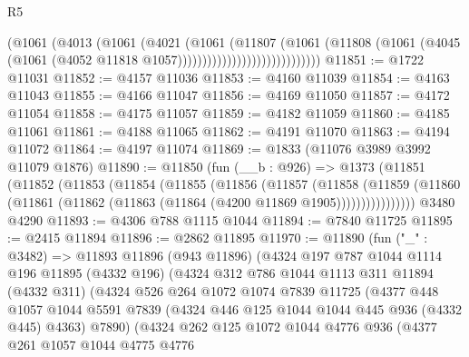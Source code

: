 \begin{lexlean}{R5}
\begin{coremodule}
                                      (@1061
                                        (@4013
                                          (@1061
                                            (@4021
                                              (@1061
                                                (@11807
                                                  (@1061
                                                    (@11808
                                                      (@1061
                                                        (@4045
                                                          (@1061
                                                            (@4052
                                                              @11818
                                                              @1057)))))))))))))))))))))))))))))
@11851 := @1722 @11031
@11852 := @4157 @11036
@11853 := @4160 @11039
@11854 := @4163 @11043
@11855 := @4166 @11047
@11856 := @4169 @11050
@11857 := @4172 @11054
@11858 := @4175 @11057
@11859 := @4182 @11059
@11860 := @4185 @11061
@11861 := @4188 @11065
@11862 := @4191 @11070
@11863 := @4194 @11072
@11864 := @4197 @11074
@11869 := @1833 (@11076 @3989 @3992 @11079 @1876)
@11890 := @11850
    (fun (__b : @926) =>
    @1373
      (@11851
        (@11852
          (@11853
            (@11854
              (@11855
                (@11856
                  (@11857
                    (@11858
                      (@11859
                        (@11860 (@11861 (@11862 (@11863 (@11864 (@4200 @11869 @1905))))))))))))))))
    @3480
    @4290
@11893 := @4306 @788 @1115 @1044
@11894 := @7840 @11725
@11895 := @2415 @11894
@11896 := @2862 @11895
@11970 := @11890
    (fun ("_" : @3482) =>
    @11893
      @11896
      (@943 @11896)
      (@4324
        @197
        @787
        @1044
        @1114
        @196
        @11895
        (@4332 @196)
        (@4324
          @312
          @786
          @1044
          @1113
          @311
          @11894
          (@4332 @311)
          (@4324
            @526
            @264
            @1072
            @1074
            @7839
            @11725
            (@4377
              @448
              @1057
              @1044
              @5591
              @7839
              (@4324 @446 @125 @1044 @1044 @445 @936 (@4332 @445) @4363)
              @7890)
            (@4324
              @262
              @125
              @1072
              @1044
              @4776
              @936
              (@4377
                @261
                @1057
                @1044
                @4775
                @4776

\end{coremodule}
\end{lexlean}
